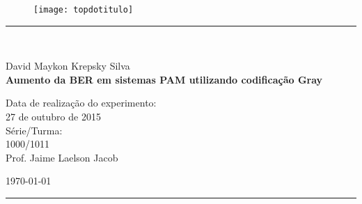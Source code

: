 \begin{titlepage}
\begin{center}
\begin{figure}[h]
\texttt{[image: topdotitulo]}
\end{figure}
\rule{\columnwidth}{1.5mm}
\

\large David Maykon Krepsky Silva\\

\vspace{4cm}
{\bf \Large Aumento da BER em sistemas PAM utilizando codificação Gray}
\vspace{3.5cm}

\begin{flushright}
Data de realização do experimento:\\
27 de outubro de 2015\\
Série/Turma:\\
1000/1011\\
Prof. Jaime Laelson Jacob
\end{flushright}

\vspace{3.2cm}
\today

\rule{\columnwidth}{1.3mm}
\end{center}
\end{titlepage}